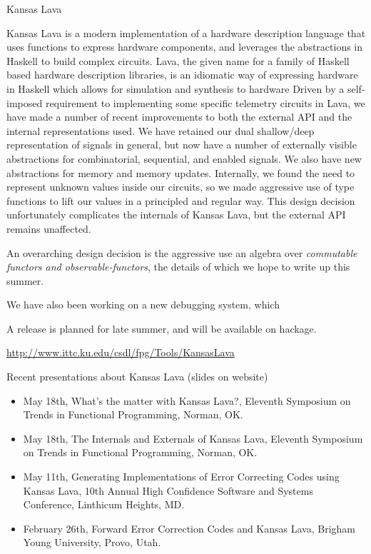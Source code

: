 \documentclass{scrreprt}
\begin{document}
\begin{hcarentry}{Kansas Lava}
\makeheader

Kansas Lava is a modern implementation of a hardware description language
that uses functions to express hardware components,
and leverages the abstractions in Haskell to build complex circuits. 
Lava, 
the given name for a family of Haskell based hardware description libraries,
is an idiomatic way of expressing hardware in Haskell which allows for simulation and
synthesis to hardware
Driven by a self-imposed requirement to implementing some specific telemetry circuits in Lava,
we have made a number of recent improvements to both the external API
and the internal representations used. 
We have retained our dual shallow/deep
representation of signals in general, but now have a number of externally visible
abstractions for combinatorial, sequential, and enabled signals.
We also have new abstractions for memory and memory updates.
Internally, we found the need to represent unknown values inside our circuits, 
so we made aggressive use of type functions to lift our values in a principled
and regular way. This design decision unfortunately 
complicates the internals of Kansas Lava, but the external
API remains unaffected.

An overarching design decision is the aggressive use an algebra over {\em commutable functors and observable-functors\/}, the details of which we hope to write up this summer.

We have also been working on a new debugging system, which 

A release is planned for late summer, and will be available on hackage.

\FurtherReading
  \url{http://www.ittc.ku.edu/csdl/fpg/Tools/KansasLava}

Recent presentations about Kansas Lava (slides on website)
\begin{itemize}
\item May 18th, What's the matter with Kansas Lava?, Eleventh Symposium on Trends in Functional Programming, Norman, OK.
\item May 18th, The Internals and Externals of Kansas Lava, Eleventh Symposium on Trends in Functional Programming, Norman, OK.
\item May 11th, Generating Implementations of Error Correcting Codes using Kansas Lava, 10th Annual High Confidence  Software and Systems Conference, Linthicum Heights, MD.
\item February 26th, Forward Error Correction Codes and Kansas Lava, Brigham Young University, Provo, Utah.
\end{itemize}

\end{hcarentry}
\end{document}
